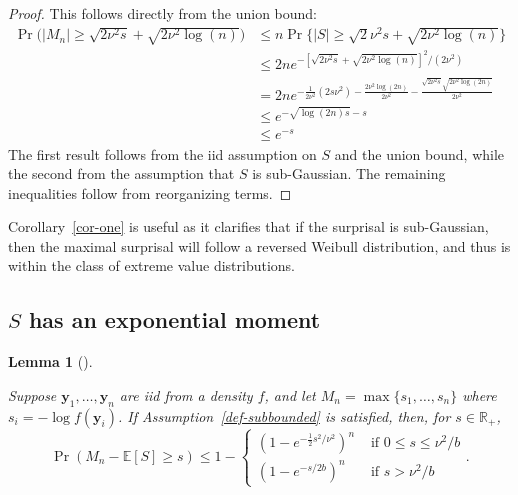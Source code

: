 \documentclass[
  12pt]{article}
\newcommand{\E}{\mathbb{E}}
\theoremstyle{plain}
\theoremstyle{plain}
\theoremstyle{definition}
\theoremstyle{plain}
\newtheorem{lemma}{Lemma}[section]
\theoremstyle{remark}
\begin{document}
\begin{proof}
This follows directly from the union bound: \begin{align}
\Pr\Big(|M_n|\ge \sqrt{2\nu^2s} + \sqrt{2\nu^2\log(n)}\Big)
 & \le n \Pr\Big\{|S|\ge \sqrt{2}\nu^2s + \sqrt{2\nu^2\log(n)}\Big\} \\
 & \le 2n e^{-[\sqrt{2\nu^2s}+\sqrt{2\nu^2\log(n)}]^2/(2\nu^2)} \\
 & = 2n e^{-\frac{1}{2\nu^2}(2s\nu^2 )-\frac{2\nu^2\log(2n)}{2\nu^2}-\frac{\sqrt{2\nu^2s}\sqrt{2\nu^2\log(2n)}}{2\nu^2}} \\
 & \le e^{-\sqrt{\log(2n)s}-s} \\
 & \le e^{-s}
\end{align} The first result follows from the iid assumption on \(S\)
and the union bound, while the second from the assumption that \(S\) is
sub-Gaussian. The remaining inequalities follow from reorganizing terms.
\end{proof}

Corollary~\ref{cor-one} is useful as it clarifies that if the surprisal
is sub-Gaussian, then the maximal surprisal will follow a reversed
Weibull distribution, and thus is within the class of extreme value
distributions.

\subsection{\texorpdfstring{\(S\) has an exponential
moment}{S has an exponential moment}}\label{s-has-an-exponential-moment}

\begin{lemma}[]\protect\hypertarget{lem-bounds_sub}{}\label{lem-bounds_sub}

Suppose \(\bm{y}_1,\dots,\bm{y}_n\) are iid from a density \(f\), and
let \(M_n = \max\{s_1,\dots,s_n\}\) where \(s_i = -\log f(\bm{y}_i)\).
If Assumption~\ref{def-subbounded} is satisfied, then, for
\(s\in\mathbb{R}_+\), \[
    \Pr\left(M_n-\E[S]\ge s\right)\le 1-
    \begin{cases}
        (1-e^{-\frac{1}{2}s^2/\nu^2})^n & \text{ if }0\le s\le \nu^2/b \\
        (1-e^{-s/2b})^n                 & \text{ if }s>\nu^2/b
    \end{cases}.
\]

\end{lemma}
\end{document}
